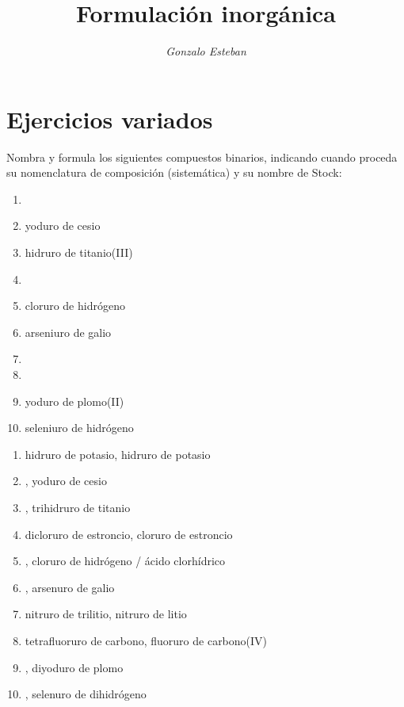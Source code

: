 \documentclass[10pt,a5paper,twoside]{article}
\title{Formulación inorgánica}
\author{\textit{Gonzalo Esteban}}
\begin{document}
\maketitle

\section{Ejercicios variados}

\begin{exercise}[
    tags    = {inorgánica,compuestos binarios,sales binarias,sales,hidruros},
    topics  = {química inorgánica,formulación,nomenclatura},
    source  = {SAN Formulación, p26, e28},
  ]
  Nombra y formula los siguientes compuestos binarios, indicando cuando proceda su nomenclatura de composición (sistemática) y su nombre de Stock:

  \begin{enumerate}
    \item {}
    \item yoduro de cesio
    \item hidruro de titanio(III)
    \item {}
    \item cloruro de hidrógeno
    \item arseniuro de galio
    \item {}
    \item {}
    \item yoduro de plomo(II)
    \item seleniuro de hidrógeno
  \end{enumerate}
\end{exercise}

\begin{solution}
  \begin{enumerate}
    \item hidruro de potasio, hidruro de potasio
    \item {}, yoduro de cesio
    \item {}, trihidruro de titanio
    \item dicloruro de estroncio, cloruro de estroncio
    \item {}, cloruro de hidrógeno / ácido clorhídrico
    \item {}, arsenuro de galio
    \item nitruro de trilitio, nitruro de litio
    \item tetrafluoruro de carbono, fluoruro de carbono(IV)
    \item {}, diyoduro de plomo
    \item {}, selenuro de dihidrógeno
  \end{enumerate}
\end{solution}
\end{document}
